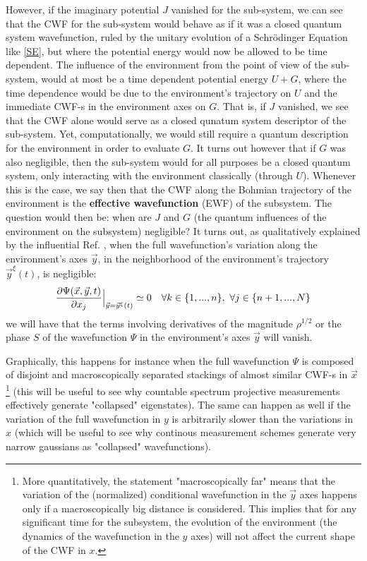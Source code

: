\documentclass[11pt, a4paper]{article} %
\begin{document}
However, if the imaginary potential $J$ vanished for the sub-system, we can see that the CWF for the sub-system would behave as if it was a closed quantum system wavefunction, ruled by the unitary evolution of a Schrödinger Equation like \eqref{SE}, but where the potential energy would now be allowed to be time dependent. The influence of the environment from the point of view of the sub-system, would at most be a time dependent potential energy $U+G$, where the time dependence would be due to the environment's trajectory on $U$ and the immediate CWF-s in the environment axes on $G$. That is, if $J$ vanished, we see that the CWF alone would serve as a closed qunatum system descriptor of the sub-system. Yet, computationally, we would still require a quantum description for the environment in order to evaluate $G$. It turns out however that if $G$ was also negligible, then the sub-system would for all purposes be a closed quantum system, only interacting with the environment classically (through $U$). Whenever this is the case, we say then that the CWF along the Bohmian trajectory of the environment is the {\bf effective wavefunction} (EWF) of the subsystem. The question would then be: when are $J$ and $G$ (the quantum influences of the environment on the subsystem) negligible? It turns out, as qualitatively explained by the influential Ref. \cite{Absolute}, when the full wavefunction's variation along the environment's axes $\vec{y}$, in the neighborhood of the environment's trajectory $\vec{y}^\xi(t)$, is negligible: 
\begin{equation}
\pdv{\Psi(\vec{x},\vec{y},t)}{x_j}\Big\rvert_{\vec{y}=\vec{y}^\xi(t)}\simeq 0  \quad \forall k\in\{1,...,n\}, \ \forall j\in\{n+1,...,N\}
\end{equation}
we will have that the terms involving derivatives of the magnitude $\rho^{1/2}$ or the phase $S$ of the wavefunction $\Psi$ in the environment's axes $\vec{y}$ will vanish.

Graphically, this happens for instance when the full wavefunction $\Psi$ is composed of disjoint and macroscopically separated stackings of almost similar CWF-s in $\vec{x}$ \footnote{More quantitatively, the statement "macroscopically far" means that the variation of the (normalized) conditional wavefunction in the $\vec{y}$ axes happens only if a macroscopically big distance is considered. This implies that for any significant time for the subsystem, the evolution of the environment (the dynamics of the wavefunction in the $y$ axes) will not affect the current shape of the CWF in $x$.} (this will be useful to see why countable spectrum projective measurements effectively generate "collapsed" eigenstates). The same can happen as well if the variation of the full wavefunction in $y$ is arbitrarily slower than the variations in $x$ (which will be useful to see why continous measurement schemes generate very narrow gaussians as "collapsed" wavefunctions).
\end{document}
